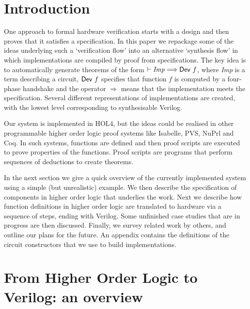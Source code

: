 \documentclass{llncs}
\begin{document}
\section{Introduction}
\label{secIntroduction}
One approach to formal hardware verification starts with a design and
then proves that it satisfies a specification.  In this paper we
repackage some of the ideas underlying such a `verification flow' into
an alternative `synthesis flow' in which implementations are compiled
by proof from specifications.  
The key idea is to
automatically generate theorems of the form $\vdash
{\it{Imp}}\Longrightarrow\mathsf{Dev}~f$, where {\it{Imp}} is a term
describing a circuit, $\mathsf{Dev}~f$ specifies that function $f$ is
computed by a four-phase handshake and the operator $\Longrightarrow$
means that the implementation meets the specification.  Several
different representations of implementations are created, with the
lowest level corresponding to synthesisable Verilog.


Our system is implemented in HOL4, but the ideas could be
realised in other programmable higher order logic proof systems like
Isabelle, PVS, NuPrl and Coq. In such systems, functions are defined
and then proof scripts are executed to prove properties of
the functions.  Proof scripts are programs that perform sequences of
deductions to create theorems.

In the next section we give a quick overview of the currently
implemented system using a simple (but unrealistic) example. We then
describe the specification of components in higher order logic that
underlies the work. Next we describe how function definitions in
higher order logic are translated to hardware via a sequence of steps,
ending with Verilog.  Some unfinished case studies that are in
progress are then discussed. Finally, we survey related work by
others, and outline our plans for the future. An appendix contains the
definitions of the circuit constructors that we use to build
implementations.

\vspace*{-3mm}



\section{From Higher Order Logic to Verilog: an overview}
\label{secHOL2Verilog}
\vspace*{-2mm}
\end{document}
